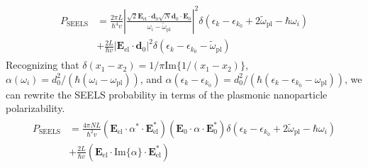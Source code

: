 \documentclass [11pt, proquest] {uwthesis}[2016/11/22]
\begin{document}
\begin{align}
\begin{split}
  P_{\textrm{SEELS}} &= \frac{2\pi L}{\hbar^4v}\left|\frac{\sqrt{2}\textbf{E}_{\textrm{el}}\cdot\textbf{d}_0 \sqrt{N}\textbf{d}_0\cdot\textbf{E}_{0}}{\omega_i - \tilde{\omega}_{\textrm{pl}}}\right|^2\delta(\epsilon_k - \epsilon_{k_0} + 2\tilde{\omega}_{\textrm{pl}} - \hbar\omega_i)\\
  &+ \frac{2L}{\hbar v}|\textbf{E}_{\textrm{el}}\cdot\textbf{d}_0|^2\delta(\epsilon_k - \epsilon_{k_0} - \tilde{\omega}_{\textrm{pl}})
  \label{change_eels}
  \end{split}
\end{align}
Recognizing that $\delta(x_1 - x_2) = 1/\pi\textrm{Im}\{1/(x_1-x_2)\}$, $\alpha(\omega_i) = d_0^2/(\hbar(\omega_i-\omega_{\textrm{pl}}))$, and $\alpha(\epsilon_k-\epsilon_{k_0}) = d_0^2/(\hbar(\epsilon_k-\epsilon_{k_0}-\omega_{\textrm{pl}}))$, we can rewrite the SEELS probability in terms of the plasmonic nanoparticle polarizability.
\begin{align}
\begin{split}
  P_{\textrm{SEELS}} &= \frac{4\pi NL}{\hbar^2v}(\textbf{E}_{\textrm{el}}\cdot\alpha^*\cdot\textbf{E}_{\textrm{el}}^*)(\textbf{E}_0\cdot\alpha\cdot\textbf{E}_0^*)\delta(\epsilon_k - \epsilon_{k_0} + 2\tilde{\omega}_{\textrm{pl}} - \hbar\omega_i)\\
  &+ \frac{2L}{\hbar v}(\textbf{E}_{\textrm{el}}\cdot\textrm{Im}\{\alpha\}\cdot\textbf{E}_{\textrm{el}}^*)
  \label{seels_with_polar}
  \end{split}
\end{align}
\end{document}
